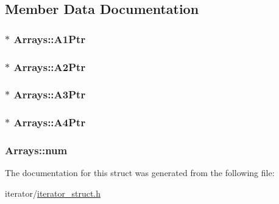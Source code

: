 \subsection{Member Data Documentation}
\hypertarget{structArrays_a4afff80d1350b239c63ccebefb0bbcdc}{
\subsubsection[{A1Ptr}]{$\ast$ {\bf Arrays::A1Ptr}}}
\label{structArrays_a4afff80d1350b239c63ccebefb0bbcdc}
\hypertarget{structArrays_a20f4dd3a96e92c901b4a8e5839ce56d4}{
\subsubsection[{A2Ptr}]{$\ast$ {\bf Arrays::A2Ptr}}}
\label{structArrays_a20f4dd3a96e92c901b4a8e5839ce56d4}
\hypertarget{structArrays_a31f864fe33526915aae04225e7247dae}{
\subsubsection[{A3Ptr}]{$\ast$ {\bf Arrays::A3Ptr}}}
\label{structArrays_a31f864fe33526915aae04225e7247dae}
\hypertarget{structArrays_a58dccb45a8327bcc3a5b9404545a88e4}{
\subsubsection[{A4Ptr}]{$\ast$ {\bf Arrays::A4Ptr}}}
\label{structArrays_a58dccb45a8327bcc3a5b9404545a88e4}
\hypertarget{structArrays_a966d6557f9a47938f7b8928470361215}{
\subsubsection[{num}]{ {\bf Arrays::num}}}
\label{structArrays_a966d6557f9a47938f7b8928470361215}


The documentation for this struct was generated from the following file:\begin{DoxyCompactItemize}
\item 
iterator/\hyperlink{iterator__struct_8h}{iterator\_\-struct.h}\end{DoxyCompactItemize}

